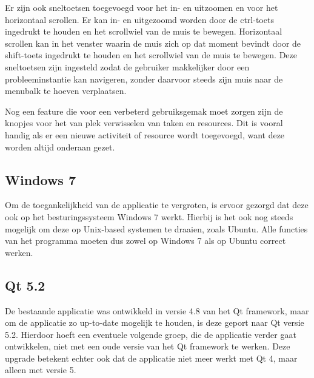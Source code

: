 Er zijn ook sneltoetsen toegevoegd voor het in- en uitzoomen en voor het horizontaal scrollen. Er kan in- en uitgezoomd worden door de ctrl-toets ingedrukt te houden en het scrollwiel van de muis  te bewegen. Horizontaal scrollen kan in het venster waarin de muis zich op dat moment bevindt door de shift-toets ingedrukt te houden en het scrollwiel van de muis te bewegen. Deze sneltoetsen zijn ingesteld zodat de gebruiker makkelijker door een probleeminstantie kan navigeren, zonder daarvoor steeds zijn muis naar de menubalk te hoeven verplaatsen.

Nog een feature die voor een verbeterd gebruiksgemak moet zorgen zijn de knopjes voor het van plek verwisselen van taken en resources. Dit is vooral handig als er een nieuwe activiteit of resource wordt toegevoegd, want deze worden altijd onderaan gezet. 

\subsection{Windows 7}
Om de toegankelijkheid van de applicatie te vergroten, is ervoor gezorgd dat deze ook op het besturingssysteem Windows 7 werkt. Hierbij is het ook nog steeds mogelijk om deze op Unix-based systemen te draaien, zoals Ubuntu. Alle functies van het programma moeten dus zowel op Windows 7 als op Ubuntu correct werken.

\subsection{Qt 5.2}
De bestaande applicatie was ontwikkeld in versie 4.8 van het Qt framework, maar om de applicatie zo up-to-date mogelijk te houden, is deze geport naar Qt versie 5.2. Hierdoor hoeft een eventuele volgende groep, die de applicatie verder gaat ontwikkelen, niet met een oude versie van het Qt framework te werken. Deze upgrade betekent echter ook dat de applicatie niet meer werkt met Qt 4, maar alleen met versie 5.
